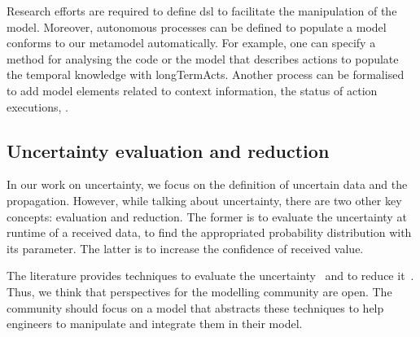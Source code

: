 Research efforts are required to define \gls{dsl} to facilitate the manipulation of the \gls{model}.
Moreover, autonomous processes can be defined to populate a \gls{model} conforms to our \gls{metamodel} automatically.
For example, one can specify a method for analysing the code or the model that describes \glspl{action} to populate the temporal knowledge with \glspl{longTermAct}.
Another process can be formalised to add \gls{model} elements related to context information, the status of action executions, \etc.

\subsection{Uncertainty evaluation and reduction}
In our work on uncertainty, we focus on the definition of uncertain data and the propagation.
However, while talking about uncertainty, there are two other key concepts: evaluation and reduction.
The former is to evaluate the uncertainty at runtime of a received data, \eg to find the appropriated probability distribution with its parameter.
The latter is to increase the confidence of received value.

The literature provides techniques to evaluate the uncertainty~\cite{wubbeler2008evaluation, metrology2008evaluation} and to reduce it~\cite{shafer1992dempster}.
Thus, we think that perspectives for the modelling community are open.
The community should focus on a \gls{model} that abstracts these techniques to help engineers to manipulate and integrate them in their model.
